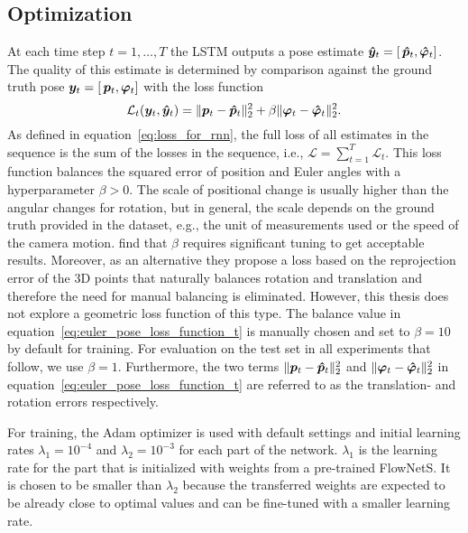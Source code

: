		\subsection{Optimization}
			At each time step $t = 1, \dots, T$ the LSTM outputs a pose estimate 
			$\bm{\hat{y}}_t = \left[ \, \bm{\hat{p}}_t,  \bm{\hat{\varphi}}_t \right]$.
			The quality of this estimate is determined by comparison against the ground truth pose 
			$\bm{y}_t = \left[ \, \bm{p}_t,  \bm{\varphi}_t \right]$
			with the loss function
			\begin{equation}\label{eq:euler_pose_loss_function_t}
				\mathcal{L}_t(\bm{y}_t, \bm{\hat{y}}_t) = 
					\lVert \bm{p}_t - \bm{\hat{p}}_t \rVert_2^2 + 
					\beta \lVert \bm{\varphi}_t - \bm{\hat{\varphi}}_t \rVert_2^2.
			\end{equation}
			As defined in equation~\ref{eq:loss_for_rnn}, the full loss of all estimates in the sequence is the sum of the losses in the sequence, i.e., 
			$\mathcal{L} = \sum_{t = 1}^{T} \mathcal{L}_t$.
			This loss function balances the squared error of position and Euler angles with a hyperparameter $\beta > 0$.
			The scale of positional change is usually higher than the angular changes for rotation, but in general, the scale depends on the ground truth provided in the dataset, e.g., the unit of measurements used or the speed of the camera motion.
			\cite{kendall2017geometric} find that $\beta$ requires significant tuning to get acceptable results.
			Moreover, as an alternative they propose a loss based on the reprojection error of the 3D points that naturally balances rotation and translation and therefore the need for manual balancing is eliminated.
			However, this thesis does not explore a geometric loss function of this type.
			The balance value in equation~\ref{eq:euler_pose_loss_function_t} is manually chosen and set to $\beta = 10$ by default for training.
			For evaluation on the test set in all experiments that follow, we use $\beta = 1$.
			Furthermore, the two terms 
			$\lVert \bm{p}_t - \bm{\hat{p}}_t \rVert_2^2$ and 
			$\lVert \bm{\varphi}_t - \bm{\hat{\varphi}}_t \rVert_2^2$
			in equation~\ref{eq:euler_pose_loss_function_t} are referred to as the translation- and rotation errors respectively.
			
			
			For training, the Adam optimizer is used with default settings and initial learning rates $\lambda_1 = 10^{-4}$ and $\lambda_2 = 10^{-3}$ for each part of the network.
			$\lambda_1$ is the learning rate for the part that is initialized with weights from a pre-trained FlowNetS.
			It is chosen to be smaller than $\lambda_2$ because the transferred weights are expected to be already close to optimal values and can be fine-tuned with a smaller learning rate.
			
